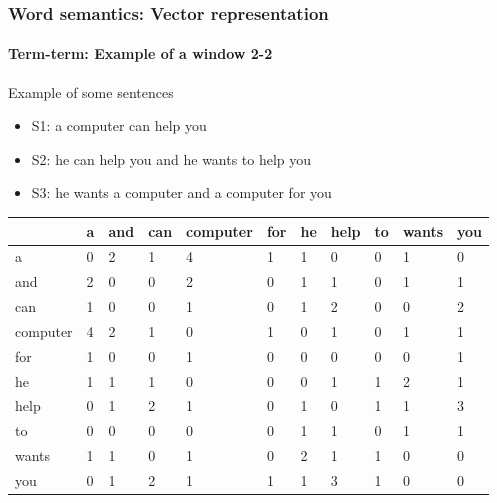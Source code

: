 \documentclass[xcolor=table]{beamer}
\begin{document}
\begin{frame}
\frametitle{Word semantics: Vector representation}
\framesubtitle{Term-term: Example of a window 2-2}

\begin{exampleblock}{Example of some sentences}
	\begin{itemize}
		\item S1: a computer can help you
		\item S2: he can help you and he wants to help you
		\item S3: he wants a computer and a computer for you
	\end{itemize}
\end{exampleblock}

\begin{center}
	\scriptsize
	\begin{tabular}{lllllllllll}
		\hline\hline
		& a & and & can & computer & for & he & help & to & wants & you \\
		\hline
		a & 0 & 2 & 1 & 4 & 1 & 1 & 0 & 0 & 1 & 0\\
		and & 2 & 0 & 0 & 2 & 0 & 1 & 1 & 0 & 1 & 1\\
		can & 1 & 0 & 0 & 1 & 0 & 1 & 2 & 0 & 0 & 2\\
		computer & 4 & 2 & 1 & 0 & 1 & 0 & 1 & 0 & 1 & 1\\
		for & 1 & 0 & 0 & 1 & 0 & 0 & 0 & 0 & 0 & 1\\
		he & 1 & 1 & 1 & 0 & 0 & 0 & 1 & 1 & 2 & 1\\
		help & 0 & 1 & 2 & 1 & 0 & 1 & 0 & 1 & 1 & 3\\
		to & 0 & 0 & 0 & 0 & 0 & 1 & 1 & 0 & 1 & 1\\
		wants & 1 & 1 & 0 & 1 & 0 & 2 & 1 & 1 & 0 & 0\\
		you & 0 & 1 & 2 & 1 & 1 & 1 & 3 & 1 & 0 & 0\\
		\hline\hline
	\end{tabular}
\end{center}

\end{frame}
\end{document}

